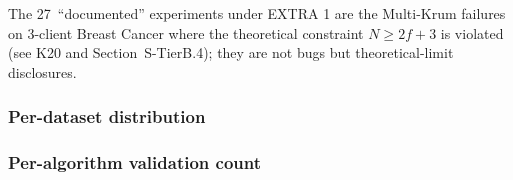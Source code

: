 \documentclass[conference]{IEEEtran}
\begin{document}
\begin{table}[htbp]
\vspace{1mm}
\footnotesize{The 27~``documented'' experiments under EXTRA 1 are the Multi-Krum failures on 3-client Breast Cancer where the theoretical constraint $N{\geq}2f{+}3$ is violated (see K20 and Section~S-TierB.4); they are not bugs but theoretical-limit disclosures.}
\end{table}

\subsubsection*{Per-dataset distribution}

\begin{table}[htbp]
\centering
\caption{Per-dataset total experiment count (pre-rebuttal $+$ post-rebuttal). The imaging total ($\sim$2{,}700) is dominated by pre-rebuttal experiments documented in the imaging sections of the supplementary; the Tier~B+ campaign focuses on tabular FL.}
\label{tab:tier_b_budget_dataset}
\small
\setlength{\tabcolsep}{5pt}
\end{table}

\subsubsection*{Per-algorithm validation count}
\end{document}
